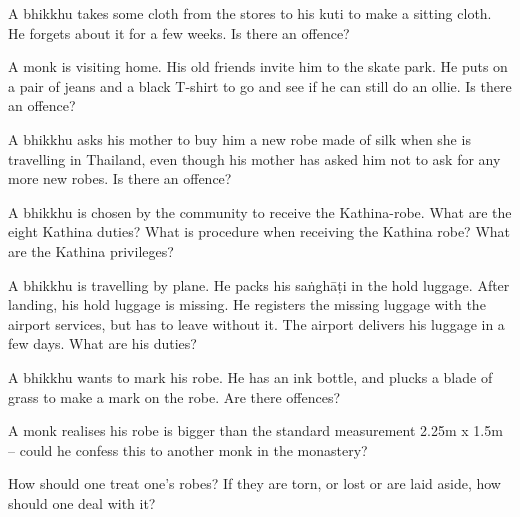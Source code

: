 \bigskip

A bhikkhu takes some cloth from the stores to his kuti to make a sitting cloth. He
forgets about it for a few weeks. Is there an offence?

\bigskip

A monk is visiting home. His old friends invite him to the skate park. He puts
on a pair of jeans and a black T-shirt to go and see if he can still do an
ollie. Is there an offence?

\bigskip

A bhikkhu asks his mother to buy him a new robe made of silk when she is travelling in Thailand,
even though his mother has asked him not to ask for any more new robes. Is there an offence?

\bigskip

A bhikkhu is chosen by the community to receive the Kathina-robe. What are the
eight Kathina duties? What is procedure when receiving the Kathina robe? What
are the Kathina privileges?

\bigskip

A bhikkhu is travelling by plane. He packs his saṅghāṭi in the hold luggage. After
landing, his hold luggage is missing. He registers the missing luggage with the
airport services, but has to leave without it. The airport delivers his luggage
in a few days. What are his duties?

\bigskip

A bhikkhu wants to mark his robe. He has an ink bottle, and plucks a blade of
grass to make a mark on the robe. Are there offences?

\bigskip

A monk realises his robe is bigger than the standard measurement 2.25m x 1.5m –
could he confess this to another monk in the monastery?

\bigskip

How should one treat one's robes? If they are torn, or lost or are laid aside, how should one deal with it?

